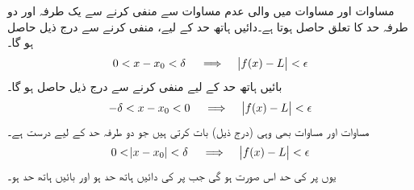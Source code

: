مساوات  اور مساوات  میں   والی عدم مساوات سے  منفی کرنے سے یک طرفہ اور دو طرفہ حد کا تعلق حاصل ہوتا ہے۔دائیں ہاتھ حد کے لیے،  منفی کرنے سے درج ذیل حاصل ہو گا۔
\begin{align}\label{مساوات_حد_یک_طرفہ_الف}
0<x-x_0<\delta\quad \implies \quad \abs{f(x)-L}<\epsilon
\end{align}
بائیں ہاتھ حد کے لیے   منفی کرنے سے درج ذیل حاصل ہو گا۔
\begin{align}\label{مساوات_حد_یک_طرفہ_ب}
-\delta<x-x_0<0\quad \implies \quad \abs{f(x)-L}<\epsilon
\end{align}
مساوات  اور مساوات  بھی وہی  (درج ذیل) بات کرتی  ہیں جو دو طرفہ حد کے لیے درست ہے۔
\begin{align}\label{مساوات_حد_یک_طرفہ_پ}
0<\abs{x-x_0}<\delta\quad \implies \quad \abs{f(x)-L}<\epsilon
\end{align}
یوں  پر  کی حد اس صورت  ہو گی  جب  پر  کی دائیں ہاتھ حد    ہو اور بائیں ہاتھ حد  ہو۔

